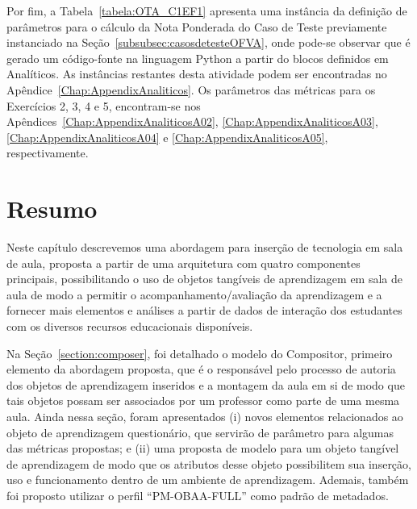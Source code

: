 Por fim, a Tabela~\ref{tabela:OTA_C1EF1} apresenta uma instância da definição de parâmetros para o cálculo da Nota Ponderada do Caso de Teste previamente instanciado na Seção~\ref{subsubsec:casosdetesteOFVA}, onde pode-se observar que é gerado um código-fonte na linguagem Python a partir do blocos definidos em Analíticos. As instâncias restantes desta atividade podem ser encontradas no Apêndice~\ref{Chap:AppendixAnaliticos}. Os parâmetros das métricas para os Exercícios 2, 3, 4 e 5, encontram-se nos Apêndices~\ref{Chap:AppendixAnaliticosA02}, \ref{Chap:AppendixAnaliticosA03}, \ref{Chap:AppendixAnaliticosA04} e \ref{Chap:AppendixAnaliticosA05}, respectivamente.

\section{Resumo}
\label{summary:ProposedMethod}

Neste capítulo descrevemos uma abordagem para inserção de tecnologia em sala de aula, proposta a partir de uma arquitetura com quatro componentes principais, possibilitando o uso de objetos tangíveis de aprendizagem em sala de aula de modo a permitir o acompanhamento/avaliação da aprendizagem e a fornecer mais elementos e análises a partir de dados de interação dos estudantes com os diversos recursos educacionais disponíveis.

Na Seção~\ref{section:composer}, foi detalhado o modelo do Compositor, primeiro elemento da abordagem proposta, que é o responsável pelo processo de autoria dos objetos de aprendizagem inseridos e a montagem da aula em si de modo que tais objetos possam ser associados por um professor como parte de uma mesma aula. Ainda nessa seção, foram apresentados (i) novos elementos relacionados ao objeto de aprendizagem questionário, que servirão de parâmetro para algumas das métricas propostas; e (ii) uma proposta de modelo para um objeto tangível de aprendizagem de modo que os atributos desse objeto possibilitem sua inserção, uso e funcionamento dentro de um ambiente de aprendizagem. Ademais, também foi proposto utilizar o perfil ``PM-OBAA-FULL'' como padrão de metadados.

